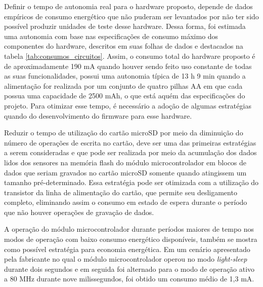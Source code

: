 
Definir o tempo de autonomia real para o hardware proposto, depende de dados empíricos de consumo energético que não puderam ser levantados por não ter sido possível produzir unidades de teste desse hardware. Dessa forma, foi estimada uma autonomia com base nas especificações de consumo máximo dos componentes do hardware, descritos em suas folhas de dados e destacados na tabela \ref{tab:consumos_circuitos}. Assim, o consumo total do hardware proposto é de aproximadamente 190 mA quando houver sendo feito uso constante de todas as suas funcionalidades, possui uma autonomia típica de 13 h 9 min quando a alimentação for realizada por um conjunto de quatro pilhas AA em que cada possua uma capacidade de 2500 mAh, o que está aquém das especificações do projeto. Para otimizar esse tempo, é necessário a adoção de algumas estratégias quando do desenvolvimento do firmware para esse hardware.

Reduzir o tempo de utilização do cartão microSD por meio da diminuição do número de operações de escrita no cartão, deve ser uma das primeiras estratégias a serem consideradas e que pode ser realizada por meio da acumulação dos dados lidos dos sensores na memória flash do módulo microcontrolador em blocos de dados que seriam gravados no cartão microSD somente quando atingissem um tamanho pré-determinado. Essa estratégia pode ser otimizada com a utilização do transistor da linha de alimentação do cartão, que permite seu desligamento completo, eliminando assim o consumo em estado de espera durante o período que não houver operações de gravação de dados. 

A operação do módulo microcontrolador durante períodos maiores de tempo nos modos de operação com baixo consumo energético disponíveis, também se mostra como possível estratégia para economia energética. Em um cenário apresentado pela fabricante  no qual o módulo microcontrolador operou no modo \textit{light-sleep} durante dois segundos e em seguida foi alternado para o modo de operação ativo a 80 MHz durante nove milissegundos, foi obtido um consumo médio de 1,3 mA.








